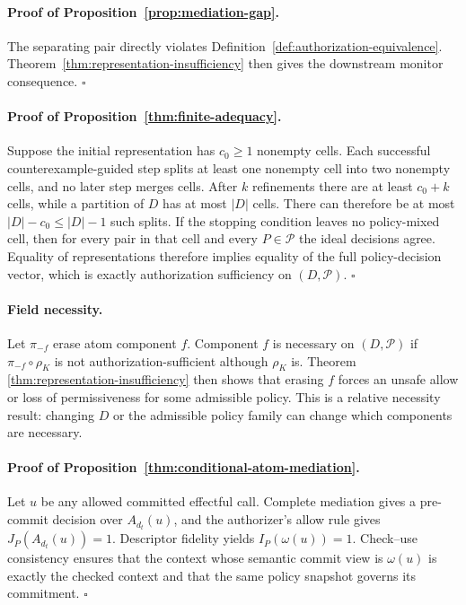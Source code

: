 \paragraph{Proof of Proposition~\ref{prop:mediation-gap}.}
The separating pair directly violates Definition~\ref{def:authorization-equivalence}.
Theorem~\ref{thm:representation-insufficiency} then gives the downstream
monitor consequence. \hfill$\square$

\paragraph{Proof of Proposition~\ref{thm:finite-adequacy}.}
Suppose the initial representation has $c_0\geq 1$ nonempty cells.  Each
successful counterexample-guided step splits at least one nonempty cell into two
nonempty cells, and no later step merges cells.  After $k$ refinements there are
at least $c_0+k$ cells, while a partition of $D$ has at most $|D|$ cells.  There
can therefore be at most $|D|-c_0\leq |D|-1$ such splits.  If the stopping
condition leaves no policy-mixed cell, then for every pair in that cell and
every $P\in\mathcal P$ the ideal decisions agree.  Equality of representations
therefore implies equality of the full policy-decision vector, which is exactly
authorization sufficiency on $(D,\mathcal P)$. \hfill$\square$

\paragraph{Field necessity.}
Let $\pi_{-f}$ erase atom component $f$. Component $f$ is necessary on
$(D,\mathcal{P})$ if $\pi_{-f}\circ\rho_K$ is not
authorization-sufficient although $\rho_K$ is. Theorem
\ref{thm:representation-insufficiency} then shows that erasing $f$ forces an
unsafe allow or loss of permissiveness for some admissible policy. This is a
relative necessity result: changing $D$ or the admissible policy family can
change which components are necessary.

\paragraph{Proof of Proposition~\ref{thm:conditional-atom-mediation}.}
Let $u$ be any allowed committed effectful call.  Complete mediation gives a
pre-commit decision over $A_{d_t}(u)$, and the authorizer's allow rule gives
$J_P(A_{d_t}(u))=1$.  Descriptor fidelity yields $I_P(\omega(u))=1$.
Check--use consistency ensures that the context whose semantic commit view is
$\omega(u)$ is exactly the checked context and that the same policy snapshot
governs its commitment. \hfill$\square$

